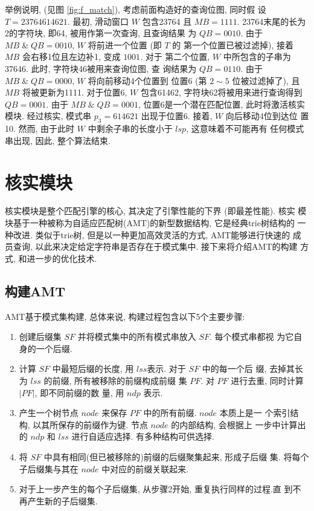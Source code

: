 举例说明, (见图 \ref{fig:f_match}), 考虑前面构造好的查询位图, 同时假
设 $T=23764614621$.  最初, 滑动窗口 $W$ 包含23764 且 $MB = 1111$.
23764末尾的长为2的字符块, 即64, 被用作第一次查询, 且查询结果
为 $QB=0010$. 由于 $MB\; \&\; QB = 0010$, $W$ 将前进一个位置 (即 $T$ 的
第一个位置已被过滤掉), 接着 $MB$ 会右移1位且左边补1, 变成 $1001$. 对于
第二个位置, $W$ 中所包含的子串为37646. 此时, 字符块46被用来查询位图, 查
询结果为 $QB=0110$. 由于 $MB\; \& \; QB=0000$, $W$ 将向前移动4个位置到
位置6 (第 $2 \sim 5$ 位被过滤掉了), 且 $MB$ 将被更新为1111. 对于位置6,
$W$ 包含61462, 字符块62将被用来进行查询得到 $QB = 0001$. 由于 $MB\; \&
\; QB = 0001$, 位置6是一个潜在匹配位置, 此时将激活核实模块. 经过核实,
模式串 $p_3=614621$ 出现于位置6. 接着, $W$ 向后移动4位到达位
置10. 然而, 由于此时 $W$ 中剩余子串的长度小于 $lsp$, 这意味着不可能再有
任何模式串出现, 因此, 整个算法结束.

\section{核实模块}
\label{sec:verification}

核实模块是整个匹配引擎的核心, 其决定了引擎性能的下界 (即最差性能). 核实
模块基于一种被称为自适应匹配树(AMT)的新型数据结构, 它是经典trie树结构的
一种改进. 类似于trie树, 但是以一种更加高效灵活的方式, AMT能够进行快速的
成员查询, 以此来决定给定字符串是否存在于模式集中. 接下来将介绍AMT的构建
方式, 和进一步的优化技术.

\subsection{构建AMT}
\label{subsec:amt}

AMT基于模式集构建, 总体来说, 构建过程包含以下5个主要步骤:

\begin{enumerate}
\item 创建后缀集 $SF$ 并将模式集中的所有模式串放入 $SF$. 每个模式串都视
  为它自身的一个后缀.
\item 计算 $SF$ 中最短后缀的长度, 用 $lss$表示. 对于 $SF$ 中的每一个后
  缀, 去掉其长为 $lss$ 的前缀, 所有被移除的前缀构成前缀
  集 $PF$. 对 $PF$ 进行去重, 同时计算 $|PF|$, 即不同前缀的数
  量, 用 $ndp$ 表示.
\item 产生一个树节点 $node$ 来保存 $PF$ 中的所有前缀. $node$ 本质上是一
  个索引结构, 以其所保存的前缀作为键. 节点 $node$ 的内部结构, 会根据上
  一步中计算出的 $ndp$ 和 $lss$ 进行自适应选择. 有多种结构可供选择.
\item 将 $SF$ 中具有相同(但已被移除的)前缀的后缀聚集起来, 形成子后缀
  集. 将每个子后缀集与其在 $node$ 中对应的前缀关联起来.
\item 对于上一步产生的每个子后缀集, 从步骤2开始, 重复执行同样的过程.直
  到不再产生新的子后缀集.
\end{enumerate}

